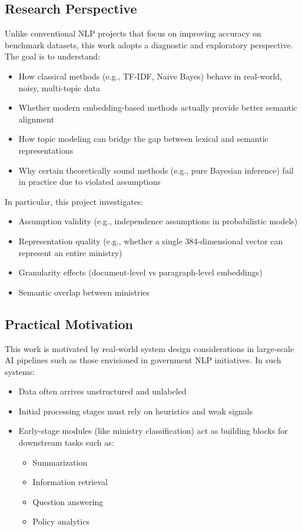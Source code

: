 \documentclass{report}
\begin{document}
\subsection{Research Perspective}
Unlike conventional NLP projects that focus on improving accuracy on benchmark datasets, this work adopts a diagnostic and exploratory perspective. The goal is to understand:
\begin{itemize}
    \item How classical methods (e.g., TF-IDF, Naive Bayes) behave in real-world, noisy, multi-topic data
    \item Whether modern embedding-based methods actually provide better semantic alignment
    \item How topic modeling can bridge the gap between lexical and semantic representations
    \item Why certain theoretically sound methods (e.g., pure Bayesian inference) fail in practice due to violated assumptions
\end{itemize}
In particular, this project investigates:
\begin{itemize}
    \item Assumption validity (e.g., independence assumptions in probabilistic models)
    \item Representation quality (e.g., whether a single 384-dimensional vector can represent an entire ministry)
    \item Granularity effects (document-level vs paragraph-level embeddings)
    \item Semantic overlap between ministries
\end{itemize}

\subsection{Practical Motivation}
This work is motivated by real-world system design considerations in large-scale AI pipelines such as those envisioned in government NLP initiatives. In such systems:
\begin{itemize}
    \item Data often arrives unstructured and unlabeled
    \item Initial processing stages must rely on heuristics and weak signals
    \item Early-stage modules (like ministry classification) act as building blocks for downstream tasks such as:
        \begin{itemize}
            \item Summarization
            \item Information retrieval
            \item Question answering
            \item Policy analytics
        \end{itemize}
\end{itemize}
\end{document}
